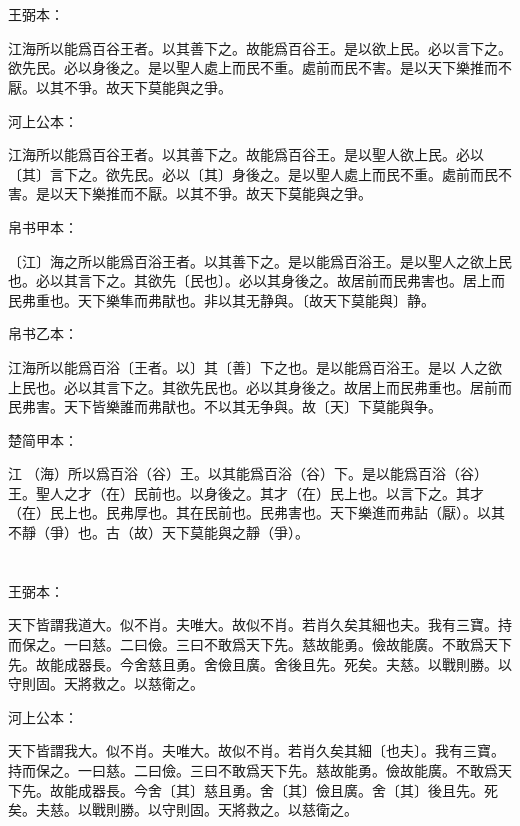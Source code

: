 \documentclass[a5paper]{ctexbook}
\begin{document}
    \chapter{}
    王弼本：

    江海所以能爲百谷王者。以其善下之。故能爲百谷王。是以欲上民。必以言下之。欲先民。必以身後之。是以聖人處上而民不重。處前而民不害。是以天下樂推而不厭。以其不爭。故天下莫能與之爭。

    河上公本：

    江海所以能爲百谷王者。以其善下之。故能爲百谷王。是以聖人欲上民。必以〔其〕言下之。欲先民。必以〔其〕身後之。是以聖人處上而民不重。處前而民不害。是以天下樂推而不厭。以其不爭。故天下莫能與之爭。

    帛书甲本：

    〔江〕海之所以能爲百浴王者。以其善下之。是以能爲百浴王。是以聖人之欲上民也。必以其言下之。其欲先〔民也〕。必以其身後之。故居前而民弗害也。居上而民弗重也。天下樂隼而弗猒也。非以其无静與。〔故天下莫能與〕静。

    帛书乙本：

    江海所以能爲百浴〔王者。以〕其〔善〕下之也。是以能爲百浴王。是以𦔻人之欲上民也。必以其言下之。其欲先民也。必以其身後之。故居上而民弗重也。居前而民弗害。天下皆樂誰而弗猒也。不以其无争與。故〔天〕下莫能與争。

    楚简甲本：

    江𣳠（海）所以爲百浴（谷）王。以其能爲百浴（谷）下。是以能爲百浴（谷）王。聖人之才（在）民前也。以身後之。其才（在）民上也。以言下之。其才（在）民上也。民弗厚也。其在民前也。民弗害也。天下樂進而弗詀（厭）。以其不靜（爭）也。古（故）天下莫能與之靜（爭）。

    \chapter{}
    王弼本：

    天下皆謂我道大。似不肖。夫唯大。故似不肖。若肖久矣其細也夫。我有三寶。持而保之。一曰慈。二曰儉。三曰不敢爲天下先。慈故能勇。儉故能廣。不敢爲天下先。故能成器長。今舍慈且勇。舍儉且廣。舍後且先。死矣。夫慈。以戰則勝。以守則固。天將救之。以慈衛之。

    河上公本：

    天下皆謂我大。似不肖。夫唯大。故似不肖。若肖久矣其細〔也夫〕。我有三寶。持而保之。一曰慈。二曰儉。三曰不敢爲天下先。慈故能勇。儉故能廣。不敢爲天下先。故能成器長。今舍〔其〕慈且勇。舍〔其〕儉且廣。舍〔其〕後且先。死矣。夫慈。以戰則勝。以守則固。天將救之。以慈衛之。
\end{document}
